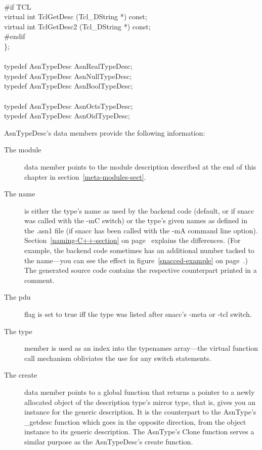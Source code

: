 \begin{Ccode}
\\
\<\#if TCL\\
  virtual int			\>\>TclGetDesc (Tcl\_DString *) const;\\
  virtual int			\>\>TclGetDesc2 (Tcl\_DString *) const;\-\\
\#endif\\
\};\\
\\
typedef AsnTypeDesc		\>\>\>AsnRealTypeDesc;\\
typedef AsnTypeDesc		\>\>\>AsnNullTypeDesc;\\
typedef AsnTypeDesc		\>\>\>AsnBoolTypeDesc;\\
\\
typedef AsnTypeDesc		\>\>\>AsnOctsTypeDesc;\\
typedef AsnTypeDesc		\>\>\>AsnOidTypeDesc;
\end{Ccode}

{\C AsnTypeDesc}'s data members provide the following information:
\begin{description}
  \item[\textnormal{The} {\C module}] data member points to the module description described at the end of this chapter in section~\ref{meta-modules-sect}.

  \item[\textnormal{The} {\C name}] is either the type's name as used by the backend code (default, or if snacc was called with the {\ufn -mC} switch) or the type's given names as defined in the {\ufn .asn1} file (if snacc has been called with the {\ufn -mA} command line option).
    Section~\ref{naming-C++-section} on page~\pageref{naming-C++-section} explains the differences.
    (For example, the backend code sometimes has an additional number tacked to the name---you can see the effect in figure~\ref{snacced-example} on page~\pageref{snacced-example}.)
    The generated source code contains the respective counterpart printed in a comment.

  \item[\textnormal{The} {\C pdu}] flag is set to {\C true} iff the type was listed after snacc's {\ufn -meta} or {\ufn -tcl} switch.

  \item[\textnormal{The} {\C type}] member is used as an index into the {\C typenames} array---the virtual function call mechanism obliviates the use for any {\C switch} statements.

  \item[\textnormal{The} {\C create}] data member points to a global function that returns a pointer to a newly allocated object of the description type's mirror type, that is, gives you an instance for the generic description.
    It is the counterpart to the {\C AsnType}'s {\C \_getdesc} function which goes in the opposite direction, from the object instance to its generic description.
    The {\C AsnType}'s {\C Clone} function serves a similar purpose as the {\C AsnTypeDesc}'s {\C create} function.
\end{description}

